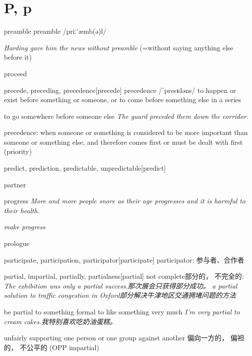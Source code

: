 \section{P, p}

\begin{DefWord}{preamble}
    preamble /priː'æmb(ə)l/

\textit{Harding gave him the news without preamble} (=without saying anything else before it)
\end{DefWord}

\begin{DefWord}{proceed}
\end{DefWord}

\begin{DefWord}{precede, preceding, precedence}[precede]
    precedence /ˈpresɪdəns/
    to happen or exist before something or someone, or to come before something else in a series

    to go somewhere before someone else
    \textit{The guard preceded them down the corridor.}

    precedence: when someone or something is considered to be more important than someone or something else, and therefore comes first or must be dealt with first (priority)
\end{DefWord}


\begin{DefWord}{predict, prediction, predictable, unpredictable}[predict]
\end{DefWord}

\begin{DefWord}{partner}
\end{DefWord}

\begin{DefWord}{progress}
    \textit{More and more people snore as their age progresses and it is harmful to their health.}

    \textit{make progress}
\end{DefWord}

\begin{DefWord}{prologue}
\end{DefWord}

\begin{DefWord}{participate, participation, participator}[participate]
    participator: 参与者、合作者
\end{DefWord}

\begin{DefWord}{partial, impartial, partially, partialness}[partial]
    not complete部分的， 不完全的:
    \textit{The exhibition was only a partial success.那次展会只获得部分成功。 }
    \textit{a partial solution to traffic congestion in Oxford部分解决牛津地区交通拥堵问题的方法}

    be partial to something formal to like something very much
    \textit{I'm very partial to cream cakes.我特别喜欢吃奶油蛋糕。 }

    unfairly supporting one person or one group against another 偏向一方的， 偏袒的， 不公平的 (OPP impartial)
\end{DefWord}

